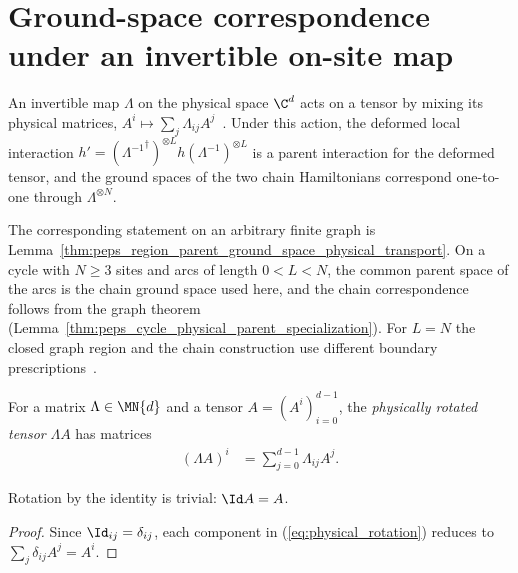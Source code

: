 \section{Ground-space correspondence under an invertible on-site map}
\label{sec:physical_deformation}

An invertible map $\Lambda$ on the physical space $\C^d$ acts on a tensor by
mixing its physical matrices, $A^i\mapsto\sum_j\Lambda_{ij}A^j$~\cite[Section~IV.C]{Cirac2021Matrix}.
Under this action, the deformed local interaction
$h'=({\Lambda^{-1}}^\dagger)^{\otimes L}h(\Lambda^{-1})^{\otimes L}$
is a parent interaction for the deformed tensor, and the ground spaces of the two
chain Hamiltonians correspond one-to-one through $\Lambda^{\otimes N}$.

The corresponding statement on an arbitrary finite graph is
Lemma~\ref{thm:peps_region_parent_ground_space_physical_transport}.
On a cycle with $N\ge3$ sites and arcs of length $0<L<N$, the common
parent space of the arcs is the chain ground space used here, and the chain
correspondence follows from the graph theorem
(Lemma~\ref{thm:peps_cycle_physical_parent_specialization}). For $L=N$ the
closed graph region and the chain construction use different boundary
prescriptions~\cite{gap:cpgsv21_physical_deformation_general_graph}.

\begin{definition}\label{def:physical_rotation}
    \leanok
    For a matrix $\Lambda\in\MN{d}$ and a tensor $A=(A^i)_{i=0}^{d-1}$, the
    \emph{physically rotated tensor} $\Lambda A$ has matrices
    \begin{align}
        (\Lambda A)^i & =\sum_{j=0}^{d-1}\Lambda_{ij}A^j.
        \label{eq:physical_rotation}
    \end{align}
\end{definition}

\begin{lemma}\label{lem:physical_rotation_one}
    \leanok
    Rotation by the identity is trivial: $\Id A=A$.
\end{lemma}

\begin{proof}
    \leanok
    Since $\Id_{ij}=\delta_{ij}$, each component in (\ref{eq:physical_rotation})
    reduces to $\sum_j\delta_{ij}A^j=A^i$.
\end{proof}

